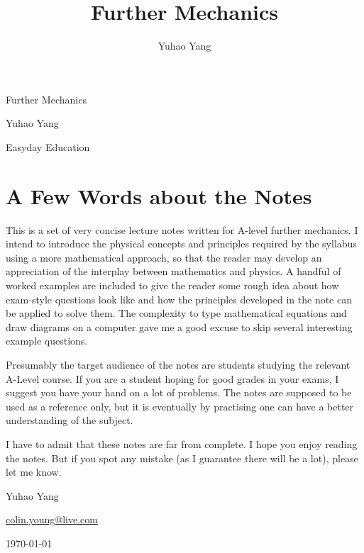 \documentclass[a4paper,12pt]{article}
\title{Further Mechanics}
\author{Yuhao Yang}
\newcounter{example}[section]
\numberwithin{equation}{section}
\numberwithin{figure}{section}
\begin{document}
	

\vspace*{5pt}

\begin{center}
	{
		\Huge Further Mechanics
	
	}
	
	{
		\Large Yuhao Yang
		
		Easyday Education
	
	}

	
\end{center}

\vspace*{5pt}

\setcounter{page}{1}
\tableofcontents

\newpage

\section*{A Few Words about the Notes}


This is a set of very concise lecture notes written for A-level further mechanics. I intend to introduce the physical concepts and principles required by the syllabus using a more mathematical approach, so that the reader may develop an appreciation of the interplay between mathematics and physics. A handful of worked examples are included to give the reader some rough idea about how exam-style questions look like and how the principles developed in the note can be applied to solve them. The complexity to type mathematical equations and draw diagrams on a computer gave me a good excuse to skip several interesting example questions.

Presumably the target audience of the notes are students studying the relevant A-Level course. If you are a student hoping for good grades in your exams, I suggest you have your hand on a lot of problems. The notes are supposed to be used as a reference only, but it is eventually by practising one can have a better understanding of the subject.

I have to admit that these notes are far from complete. I hope you enjoy reading the notes. But if you spot any mistake (as I guarantee there will be a lot), please let me know.

{

\flushright

Yuhao Yang

\url{colin.young@live.com}

\today

}


\newpage
\setcounter{page}{1}













\end{document}

